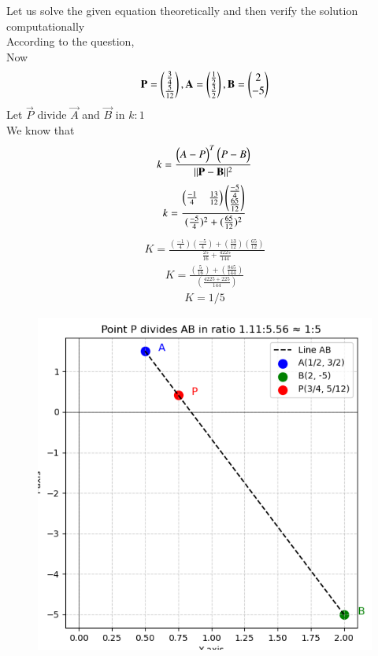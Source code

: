 \documentclass[journal,12pt,onecolumn]{IEEEtran}
\begin{document}
Let us solve the given equation theoretically and then verify the solution computationally \\
According to the question, \\
Now\\
\begin{align}
\mathbf{P}=\begin{pmatrix}\frac{3}{4}\\ \frac{5}{12}\end{pmatrix},\mathbf{A}=\begin{pmatrix}\frac{1}{2} \\ \frac{3}{2}\end{pmatrix},\mathbf{B}=\begin{pmatrix}2\\-5\end{pmatrix}
\end{align}
Let $\vec{P}$ divide $\vec{A}$ and $\vec{B}$ in $k:1$ \\
We know that 
\begin{align}
   k= \frac{\begin{pmatrix}A-P\end{pmatrix}^T\begin{pmatrix}P-B\end{pmatrix}}{\|\mathbf{P-B}\|^2} 
   \end{align}
   \begin{align}
   k=\frac{\begin{pmatrix}\frac{-1}{4} & \frac{13}{12}\end{pmatrix}\begin{pmatrix}\frac{-5}{4} \\ \frac{65}{12}\end{pmatrix}}{(\frac{-5}{4})^2+(\frac{65}{12})^2} 
   \end{align}
   \begin{align}
       K=\frac{(\frac{-1}{4})(\frac{-5}{4})+(\frac{13}{12})(\frac{65}{12})}{\frac{25}{16}+\frac{4225}{144}}
 \end{align}
 \begin{align}
     K=\frac{(\frac{5}{16})+(\frac{845}{144})}{(\frac{4225+225}{144})}
 \end{align}
\begin{align}
    K=1/5
\end{align}
\begin{figure}[h!]
    \centering
    \includegraphics[width=0.8\linewidth]{figs/fig1.png}
    \caption{}
    \label{fig}
\end{figure}
\end{document}
